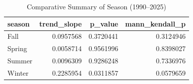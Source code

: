 \begin{table}

\caption{Comparative Summary of Season (1990–2025)}
\centering
\begin{tabular}[t]{l|r|r|r}
\hline
season & trend\_slope & p\_value & mann\_kendall\_p\\
\hline
Fall & 0.0957568 & 0.3720441 & 0.3124946\\
\hline
Spring & 0.0058714 & 0.9561996 & 0.8398027\\
\hline
Summer & 0.0096309 & 0.9286248 & 0.7336976\\
\hline
Winter & 0.2285954 & 0.0311857 & 0.0579659\\
\hline
\end{tabular}
\end{table}
